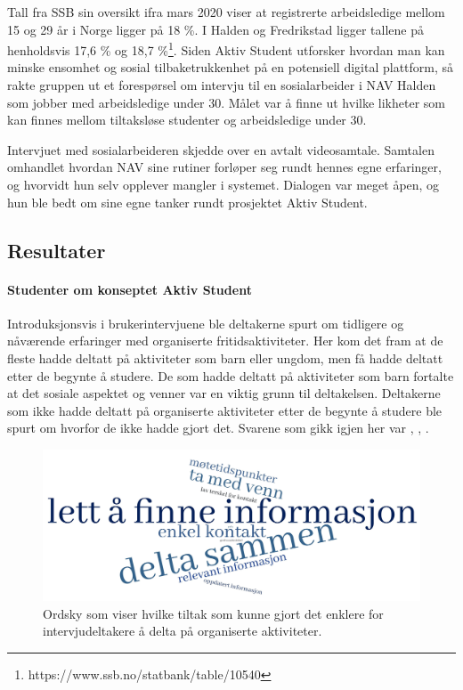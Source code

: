\vspace{10mm} %

Tall fra SSB sin oversikt ifra mars 2020 viser at registrerte arbeidsledige mellom 15 og 29 år i Norge ligger på 18 \%. I Halden og Fredrikstad ligger tallene på henholdsvis 17,6 \% og 18,7 \%\footnote{https://www.ssb.no/statbank/table/10540}.
Siden Aktiv Student utforsker hvordan man kan minske ensomhet og sosial tilbaketrukkenhet på en potensiell digital plattform, så rakte gruppen ut et forespørsel om intervju til en sosialarbeider i NAV Halden som jobber med arbeidsledige under 30. Målet var å finne ut hvilke likheter som kan finnes mellom tiltaksløse studenter og arbeidsledige under 30.

\vspace{5mm} %

Intervjuet med sosialarbeideren skjedde over en avtalt videosamtale. Samtalen omhandlet hvordan NAV sine rutiner forløper seg rundt hennes egne erfaringer, og hvorvidt hun selv opplever mangler i systemet. Dialogen var meget åpen, og hun ble bedt om sine egne tanker rundt prosjektet Aktiv Student.


\subsection{Resultater}

\paragraph{Studenter om konseptet Aktiv Student}
Introduksjonsvis i brukerintervjuene ble deltakerne spurt om tidligere og nåværende erfaringer med organiserte fritidsaktiviteter. Her kom det fram at de fleste hadde deltatt på aktiviteter som barn eller ungdom, men få hadde deltatt etter de begynte å studere. De som hadde deltatt på aktiviteter som barn fortalte at det sosiale aspektet og venner var en viktig grunn til deltakelsen. Deltakerne som ikke hadde deltatt på organiserte aktiviteter etter de begynte å studere ble spurt om hvorfor de ikke hadde gjort det. Svarene som gikk igjen her var , , .

\begin{figure}[H]
\includegraphics[width=\textwidth]{Illustrasjoner/ordsky-tiltak.jpg}
\caption{Ordsky som viser hvilke tiltak som kunne gjort det enklere for intervjudeltakere å delta på organiserte aktiviteter.}
\label{fig:ordsky-tiltak}
\end{figure}

